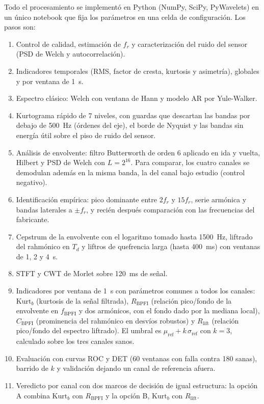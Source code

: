 \documentclass[conference,a4paper]{IEEEtran}
\newcommand{\fbpfi}{f_{\mathrm{BPFI}}}
\newcommand{\Rb}{R_{\mathrm{BPFI}}}
\newcommand{\Rl}{R_{\mathrm{lift}}}
\newcommand{\Cb}{C_{\mathrm{BPFI}}}
\newcommand{\Kb}{\mathrm{Kurt}_b}
\begin{document}
Todo el procesamiento se implementó en Python (NumPy, SciPy, PyWavelets) en un único notebook que fija los parámetros en una celda de configuración. Los pasos son:
\begin{enumerate}
\item Control de calidad, estimación de $f_r$ y caracterización del ruido del sensor (PSD de Welch y autocorrelación).
\item Indicadores temporales (RMS, factor de cresta, kurtosis y asimetría), globales y por ventana de 1~s.
\item Espectro clásico: Welch con ventana de Hann y modelo AR por Yule-Walker.
\item Kurtograma rápido de 7 niveles, con guardas que descartan las bandas por debajo de 500~Hz (órdenes del eje), el borde de Nyquist y las bandas sin energía útil sobre el piso de ruido del sensor.
\item Análisis de envolvente: filtro Butterworth de orden 6 aplicado en ida y vuelta, Hilbert y PSD de Welch con $L=2^{16}$. Para comparar, los cuatro canales se demodulan además en la misma banda, la del canal bajo estudio (control negativo).
\item Identificación empírica: pico dominante entre $2f_r$ y $15f_r$, serie armónica y bandas laterales a $\pm f_r$, y recién después comparación con las frecuencias del fabricante.
\item Cepstrum de la envolvente con el logaritmo tomado hasta 1500~Hz, liftrado del rahmónico en $T_d$ y liftros de quefrencia larga (hasta 400~ms) con ventanas de 1, 2 y 4~s.
\item STFT y CWT de Morlet sobre 120~ms de señal.
\item Indicadores por ventana de 1~s con parámetros comunes a todos los canales: $\Kb$ (kurtosis de la señal filtrada), $\Rb$ (relación pico/fondo de la envolvente en $\fbpfi$ y dos armónicos, con el fondo dado por la mediana local), $\Cb$ (prominencia del rahmónico en desvíos robustos) y $\Rl$ (relación pico/fondo del espectro liftrado). El umbral es $\mu_{\mathrm{ref}}+k\,\sigma_{\mathrm{ref}}$ con $k=3$, calculado sobre los tres canales sanos.
\item Evaluación con curvas ROC y DET (60 ventanas con falla contra 180 sanas), barrido de $k$ y validación dejando un canal de referencia afuera.
\item Veredicto por canal con dos marcos de decisión de igual estructura: la opción A combina $\Kb$ con $\Rb$ y la opción B, $\Kb$ con $\Rl$.
\end{enumerate}
\end{document}
